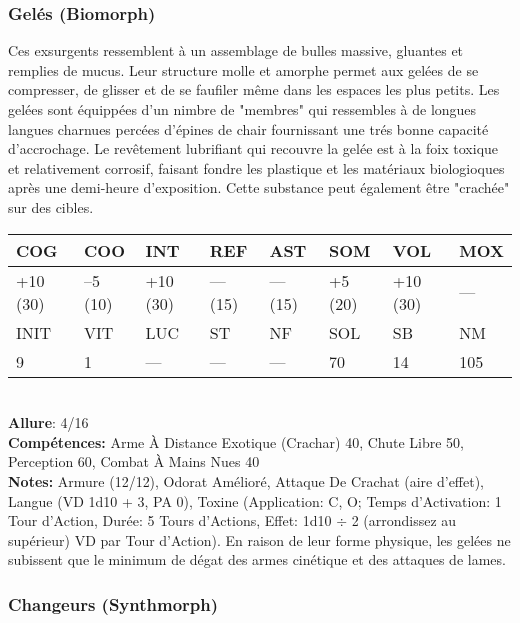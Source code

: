 \subsubsection{Gelés (Biomorph)} 

Ces exsurgents ressemblent à un assemblage de bulles massive, gluantes et remplies de mucus. Leur structure molle et amorphe permet aux gelées de se compresser, de glisser et de se faufiler même dans les espaces les plus petits. Les gelées sont équippées d'un nimbre de "membres" qui ressembles à de longues langues charnues percées d'épines de chair fournissant une trés bonne capacité d'accrochage. Le revêtement lubrifiant qui recouvre la gelée est à la foix toxique et relativement corrosif, faisant fondre les plastique et les matériaux biologioques après une demi-heure d'exposition. Cette substance peut également être "crachée" sur des cibles.\\ \begin{tabular}{|l|l|l|l|l|l|l|l|} \hline

COG &COO &INT &REF &AST &SOM &VOL &MOX \\ \hline

+10 (30) &–5 (10) &+10 (30) &— (15) &— (15) &+5 (20) &+10 (30) &— \\ \hline

INIT &VIT &LUC &ST &NF &SOL &SB &NM \\ \hline

9 &1 &— &— &— &70 &14 &105 \\ \hline

\end{tabular} \\ \textbf{Allure}: 4/16 \\ \textbf{Compétences:} Arme À Distance Exotique (Crachar) 40, Chute Libre 50, Perception 60, Combat À Mains Nues 40 \\ \textbf{Notes:} Armure (12/12), Odorat Amélioré, Attaque De Crachat (aire d'effet), Langue (VD 1d10 + 3, PA 0), Toxine (Application: C, O; Temps d'Activation: 1 Tour d'Action, Durée: 5 Tours d'Actions, Effet: 1d10 $\div$ 2 (arrondissez au supérieur) VD par Tour d'Action). En raison de leur forme physique, les gelées ne subissent que le minimum de dégat des armes cinétique et des attaques de lames. 

\subsubsection{Changeurs (Synthmorph)} 


